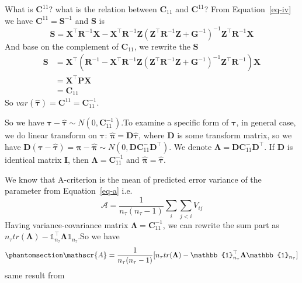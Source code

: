 \documentclass[
  a4paper,
  oneside,
  openany,
  12pt,
  onecolumn]{book}
\theoremstyle{plain}
\theoremstyle{definition}
\theoremstyle{remark}
\begin{document}
What is \(\boldsymbol{C}^{11}\)? what is the relation between
\(\boldsymbol{C}_{11}\) and \(\boldsymbol{C}^{11}\)? From
Equation~\ref{eq-iv} we have \(\boldsymbol{C}^{11}=\boldsymbol{S}^{-1}\)
and \(\boldsymbol{S}\) is \[
\boldsymbol{S} = \boldsymbol{X}^\top \boldsymbol{R}^{-1} \boldsymbol{X} - \boldsymbol{X}^\top \boldsymbol{R}^{-1} \boldsymbol{Z} (\boldsymbol{Z}^\top \boldsymbol{R}^{-1} \boldsymbol{Z} + \boldsymbol{G}^{-1})^{-1} \boldsymbol{Z}^\top \boldsymbol{R}^{-1} \boldsymbol{X}
\] And base on the complement of \(\boldsymbol{C}_{11}\), we rewrite the
\(\boldsymbol{S}\) \[
\begin{align*}
\boldsymbol{S}
&=\boldsymbol{X}^\top(\boldsymbol{R}^{-1} - \boldsymbol{X}^\top \boldsymbol{R}^{-1} \boldsymbol{Z} (\boldsymbol{Z}^\top \boldsymbol{R}^{-1} \boldsymbol{Z} + \boldsymbol{G}^{-1})^{-1} \boldsymbol{Z}^\top \boldsymbol{R}^{-1})\boldsymbol{X}\\
&=\boldsymbol{X}^\top\boldsymbol{P}\boldsymbol{X}\\
&=\boldsymbol{C}_{11}
\end{align*}
\] So
\(var(\hat{\boldsymbol{\tau}})=\boldsymbol{C}^{11}=\boldsymbol{C}_{11}^{-1}\).

So we have
\(\boldsymbol{\tau}-\hat{\boldsymbol{\tau}}\sim N(0,\boldsymbol{C}_{11}^{-1})\).To
examine a specific form of \(\boldsymbol{\tau}\), in general case, we do
linear transform on \(\boldsymbol{\tau}\):
\(\hat{\boldsymbol{\pi}}=\boldsymbol{D}\hat{\boldsymbol{\tau}}\), where
\(\boldsymbol{D}\) is some transform matrix, so we have
\(\boldsymbol{D}(\boldsymbol{\tau}-\hat{\boldsymbol{\tau}})=\boldsymbol{\pi}-\hat{\boldsymbol{\pi}}\sim N(0,\boldsymbol{D}\boldsymbol{C}_{11}^{-}\boldsymbol{D}^\top)\).
We denote
\(\boldsymbol{\Lambda}=\boldsymbol{D}\boldsymbol{C}_{11}^{-}\boldsymbol{D}^\top\).
If \(\boldsymbol{D}\) is identical matrix \(\boldsymbol{I}\), then
\(\boldsymbol{\Lambda}=\boldsymbol{C}_{11}^{-1}\) and
\(\hat{\boldsymbol{\pi}}=\hat{\boldsymbol{\tau}}\).

We know that A-criterion is the mean of predicted error variance of the
parameter from Equation~\ref{eq-a} i.e.~ \[
\mathscr{A}=\frac{1}{n_{\tau}(n_{\tau}-1)}\sum_{i}\sum_{j<i}V_{ij}
\] Having variance-covariance matrix
\(\boldsymbol{\Lambda}=\boldsymbol{C}_{11}^{-1}\), we can rewrite the
sum part as
\(n_{\tau}tr(\boldsymbol{\Lambda})-\mathbb{1}_{n_{\tau}}^\top\boldsymbol{\Lambda}\mathbb{1}_{n_{\tau}}\).So
we have \begin{equation}\phantomsection\label{eq-an}{
\mathscr{A}=\frac{1}{n_{\tau}(n_{\tau}-1)}[n_{\tau}tr(\boldsymbol{\Lambda})-\mathbb{1}_{n_{\tau}}^\top\boldsymbol{\Lambda}\mathbb{1}_{n_{\tau}}]
}\end{equation} same result from \citet{butler2013model}
\end{document}
